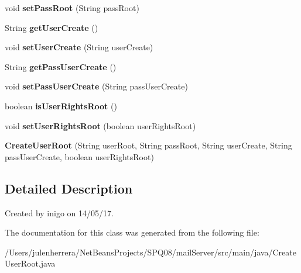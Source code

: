 \begin{DoxyCompactItemize}
void {\bfseries set\+Pass\+Root} (String pass\+Root)
\item 
\mbox{\label{class_create_user_root_a3bf1bdb585e44c54f6bb40dd08bd54bf}} 
String {\bfseries get\+User\+Create} ()
\item 
\mbox{\label{class_create_user_root_a288697775d0b4d8e61d15e587d007c6c}} 
void {\bfseries set\+User\+Create} (String user\+Create)
\item 
\mbox{\label{class_create_user_root_a2706b425eeb1642e2b3e3dce74909e1a}} 
String {\bfseries get\+Pass\+User\+Create} ()
\item 
\mbox{\label{class_create_user_root_a1fa56655ebc5cfce86df78429d22a22b}} 
void {\bfseries set\+Pass\+User\+Create} (String pass\+User\+Create)
\item 
\mbox{\label{class_create_user_root_a46105498a89702d50c7ee93b000878cc}} 
boolean {\bfseries is\+User\+Rights\+Root} ()
\item 
\mbox{\label{class_create_user_root_a20fbe3d3cda3ea5bcbc238e4baab039d}} 
void {\bfseries set\+User\+Rights\+Root} (boolean user\+Rights\+Root)
\item 
\mbox{\label{class_create_user_root_a089337f6faedcd6f4850ac9bf60c7d85}} 
{\bfseries Create\+User\+Root} (String user\+Root, String pass\+Root, String user\+Create, String pass\+User\+Create, boolean user\+Rights\+Root)
\end{DoxyCompactItemize}


\subsection{Detailed Description}
Created by inigo on 14/05/17. 

The documentation for this class was generated from the following file\+:\begin{DoxyCompactItemize}
\item 
/\+Users/julenherrera/\+Net\+Beans\+Projects/\+S\+P\+Q08/mail\+Server/src/main/java/Create\+User\+Root.\+java\end{DoxyCompactItemize}
